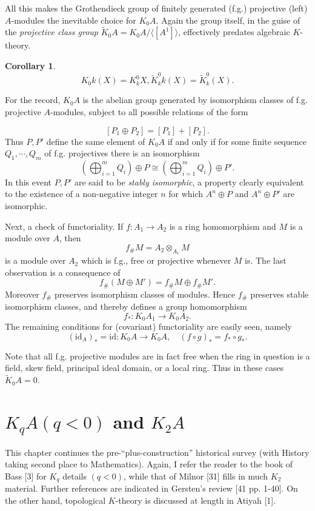 \documentclass[openany,leqno]{book}  %
\newcommand{\id}{\mathrm{id}} %
\newtheorem{corollary}[theorem]{Corollary}
\begin{document}
All this makes the Grothendieck group of finitely generated (f.g.) projective (left) $A$-modules the inevitable choice for $K_0A$. Again the group itself, in the guise of the {\em projective class group}
$\widetilde{K}_0A=K_0A/\langle [A^1] \rangle$, effectively predates algebraic $K$-theory.
\begin{corollary}
$$K_0k(X)=K_k^0X,\widetilde{K}_k^0k(X)=\widetilde{K}_k^0(X).$$
\end{corollary}

For the record, $K_0A$ is the abelian group generated by isomorphism classes of f.g. projective $A$-modules, subject to all possible relations of the form

$$[P_1\oplus P_2]=[P_1]+[P_2].$$
Thus $P,P'$ define the same element of $K_0A$ if and only if for some finite sequence $Q_1,\cdots,Q_m$ of f.g. projectives there is an isomorphism
\[(\bigoplus_{i=1}^m Q_i)\oplus P \cong (\bigoplus_{i=1}^m Q_i)\oplus P' .\]
In this event $P,P'$ are said to be {\em stably isomorphic}, a property clearly equivalent to the existence of a non-negative integer $n$ for which $A^n\oplus P$ and $A^n\oplus P'$ are isomorphic.

Next, a check of functoriality. If $f\colon  A_1\longrightarrow A_2$ is a ring homomorphism and $M$ is a module over $A$, then
$$f_\#M=A_2\otimes_{A_1}M$$
is a module over $A_2$ which is f.g., free or projective whenever $M$ is. The last observation is a consequence of
$$f_\#(M\oplus M')=f_\#M\oplus f_\# M'.$$
Moreover $f_\#$ preserves isomorphism classes of modules. Hence $f_\#$ preserves stable isomorphism classes, and thereby defines a group homomorphism
$$f_*\colon  K_0A_1 \longrightarrow K_0A_2 .$$
The remaining conditions for (covariant) functoriality are easily seen, namely
$$(\id_A)_*=\id\colon  K_0A\longrightarrow K_0A,\quad (f\circ g)_*=f_*\circ g_*.$$

Note that all f.g. projective modules are in fact free when the ring in question is a field, skew field, principal ideal domain, or a local ring. Thus in these cases $\widetilde{K}_0A=0$.

\chapter{$K_qA (q<0)$ and $K_2A$}
\label{cha:3k_qa_and_k2a}
This chapter continues the pre-``plus-construction'' historical survey (with History taking second place to Mathematics). Again, I refer the reader to the book of Bass [3] for $K_q$ details $(q<0)$, while that of Milnor [31] fills in much $K_2$ material. Further references are indicated in Gersten's review [41 pp. 1-40]. On the other hand, topological $K$-theory is discussed at length in Atiyah [1].
\end{document}
